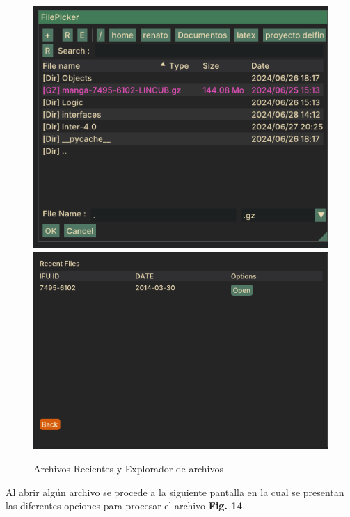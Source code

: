 \documentclass[10pt,twocolumn,a4paper]{opticajnl}
\begin{document}
\begin{figure}
    \centering
    \includegraphics[width=1\linewidth]{file_explorer_visor.png}
    \includegraphics[width=1\linewidth]{recent_files.png}
    \caption{Archivos Recientes y Explorador de archivos}
    \label{fig:recent_files}
\end{figure}

Al abrir algún archivo se procede a la siguiente pantalla en la cual se presentan las diferentes opciones para procesar el archivo \textbf{Fig. 14}.
\end{document}
